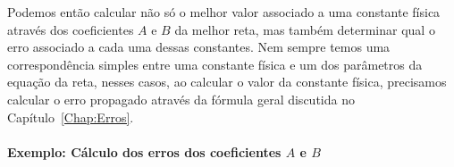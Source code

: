 Podemos então calcular não só o melhor valor associado a uma constante física através dos coeficientes $A$ e $B$ da melhor reta, mas também determinar qual o erro associado a cada uma dessas constantes. Nem sempre temos uma correspondência simples entre uma constante física e um dos parâmetros da equação da reta, nesses casos, ao calcular o valor da constante física, precisamos calcular o erro propagado através da fórmula geral discutida no Capítulo~\ref{Chap:Erros}.

\paragraph{Exemplo: Cálculo dos erros dos coeficientes $A$ e $B$}

